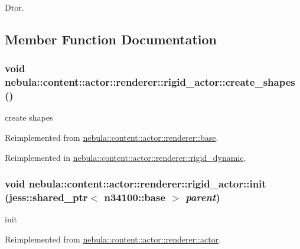 Dtor. 

\subsection{Member Function Documentation}
\hypertarget{classnebula_1_1content_1_1actor_1_1renderer_1_1rigid__actor_a1f1c2c451ac3c5cf9bd67e7e15f3df5f}{
\subsubsection[{create\_\-shapes}]{\setlength{\rightskip}{0pt plus 5cm}void nebula::content::actor::renderer::rigid\_\-actor::create\_\-shapes ()}}
\label{classnebula_1_1content_1_1actor_1_1renderer_1_1rigid__actor_a1f1c2c451ac3c5cf9bd67e7e15f3df5f}


create shapes 

Reimplemented from \hyperlink{classnebula_1_1content_1_1actor_1_1renderer_1_1base_a7a8ac733753c32792feb02a89d87a0d0}{nebula::content::actor::renderer::base}.

Reimplemented in \hyperlink{classnebula_1_1content_1_1actor_1_1renderer_1_1rigid__dynamic_adb6f10e76d5854f424b7e44db595f4b7}{nebula::content::actor::renderer::rigid\_\-dynamic}.\hypertarget{classnebula_1_1content_1_1actor_1_1renderer_1_1rigid__actor_aefd8a0b2b060c60669607f3cc060b607}{
\subsubsection[{init}]{\setlength{\rightskip}{0pt plus 5cm}void nebula::content::actor::renderer::rigid\_\-actor::init (jess::shared\_\-ptr$<$ {\bf n34100::base} $>$ {\em parent})}}
\label{classnebula_1_1content_1_1actor_1_1renderer_1_1rigid__actor_aefd8a0b2b060c60669607f3cc060b607}


init 

Reimplemented from \hyperlink{classnebula_1_1content_1_1actor_1_1renderer_1_1actor_a67bf8a3f3b53c523edced67701af7bf0}{nebula::content::actor::renderer::actor}.

